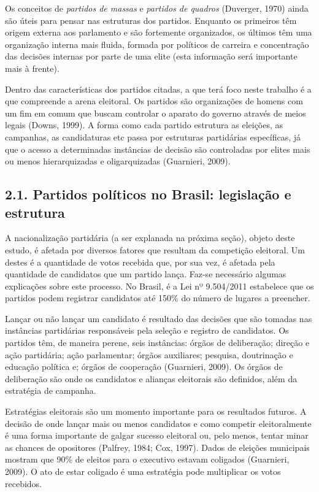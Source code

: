 \documentclass[]{article}
\begin{document}
Os conceitos de \emph{partidos de massas} e \emph{partidos de quadros}
(Duverger, 1970) ainda são úteis para pensar nas estruturas dos
partidos. Enquanto os primeiros têm origem externa aos parlamento e são
fortemente organizados, os últimos têm uma organização interna mais
fluida, formada por políticos de carreira e concentração das decisões
internas por parte de uma elite (esta informação será importante mais à
frente).

Dentro das características dos partidos citadas, a que terá foco neste
trabalho é a que compreende a arena eleitoral. Os partidos são
organizações de homens com um fim em comum que buscam controlar o
aparato do governo através de meios legais (Downs, 1999). A forma como
cada partido estrutura as eleições, as campanhas, as candidaturas etc
passa por estruturas partidárias específicas, já que o acesso a
determinadas instâncias de decisão são controladas por elites mais ou
menos hierarquizadas e oligarquizadas (Guarnieri, 2009).

\subsection{2.1. Partidos políticos no Brasil: legislação e
estrutura}\label{partidos-politicos-no-brasil-legislacao-e-estrutura}

A nacionalização partidária (a ser explanada na próxima seção), objeto
deste estudo, é afetada por diversos fatores que resultam da competição
eleitoral. Um destes é a quantidade de votos recebida que, por sua vez,
é afetada pela quantidade de candidatos que um partido lança. Faz-se
necessário algumas explicações sobre este processo. No Brasil, é a Lei
nº 9.504/2011 estabelece que os partidos podem registrar candidatos até
150\% do número de lugares a preencher.

Lançar ou não lançar um candidato é resultado das decisões que são
tomadas nas instâncias partidárias responsáveis pela seleção e registro
de candidatos. Os partidos têm, de maneira perene, seis instâncias:
órgãos de deliberação; direção e ação partidária; ação parlamentar;
órgãos auxiliares; pesquisa, doutrinação e educação política e; órgãos
de cooperação (Guarnieri, 2009). Os órgãos de deliberação são onde os
candidatos e alianças eleitorais são definidos, além da estratégia de
campanha.

Estratégias eleitorais são um momento importante para os resultados
futuros. A decisão de onde lançar mais ou menos candidatos e como
competir eleitoralmente é uma forma importante de galgar sucesso
eleitoral ou, pelo menos, tentar minar as chances de opositores
(Palfrey, 1984; Cox, 1997). Dados de eleições municipais mostram que
90\% de eleitos para o executivo estavam coligados (Guarnieri, 2009). O
ato de estar coligado é uma estratégia pode multiplicar os votos
recebidos.
\end{document}
